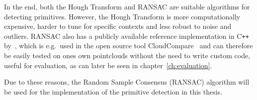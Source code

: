 In the end, both the Hough Transform and RANSAC are suitable algorithms for detecting primitives.
However, the Hough Transform is more computationally expensive, harder to tune for specific contexts and less robust to noise and outliers.
RANSAC also has a publicly available reference implementation in C\texttt{++} by~\parencite{schnabel_efficient_2007},
which is e.g.\ used in the open source tool CloudCompare~\parencite{daniel_girardeau-montaut_cloudcompare_nodate} and can therefore be
easily tested on ones own pointclouds without the need to write custom code, useful for evaluation, as can later be seen in chapter~\ref{ch:evaluation}.

Due to these reasons, the Random Sample Consensus (RANSAC) algorithm will be used for the implementation of the primitive detection in this thesis.

